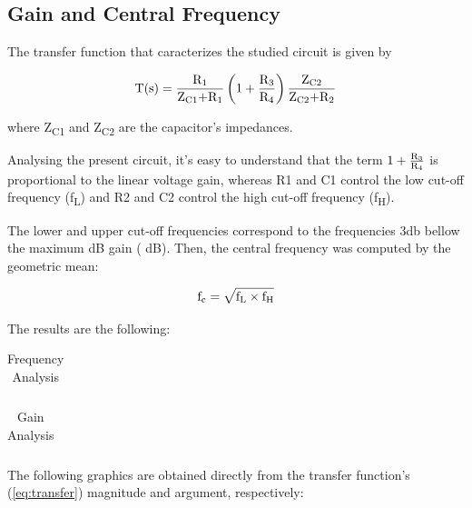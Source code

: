 \subsection{Gain and Central Frequency}
 
The transfer function that caracterizes the studied circuit is given by

\begin{equation} \label{eq:transfer}
 \text{T(s)}=\frac{\text{R\textsubscript1}}{\text{Z\textsubscript{C1}+R\textsubscript1}} \left( 1+\frac{\text{R\textsubscript3}}{\text{R\textsubscript4}}\right) \frac{\text{Z\textsubscript{C2}}}{\text{Z\textsubscript{C2}+R\textsubscript2}}
\end{equation}

where Z\textsubscript{C1} and Z\textsubscript{C2} are the capacitor's impedances.

Analysing the present circuit, it's easy to understand that the term $ 1+\frac{\text{R\textsubscript3}}{\text{R\textsubscript4}}$ is proportional to the linear voltage gain, whereas R1 and C1 control the low cut-off frequency (f\textsubscript{L}) and R2 and C2 control the high cut-off frequency (f\textsubscript{H}).

The lower and upper cut-off frequencies correspond to the frequencies 3db bellow the maximum dB gain ( dB). Then, the central frequency was computed by the geometric mean:

\begin{equation}
 \text{f\textsubscript{c}}= \sqrt{\text{f\textsubscript{L}} \times \text{f\textsubscript{H}}}
\end{equation}

The results are the following:

\begin{table}[!htb]
\centering
  \begin{tabular}{|c | c|}
    \hline    
    
 \end{tabular}
 \caption{Frequency Analysis}\label{tab:theo:frequencies}
\end{table}


\begin{table}[!htb]
\centering
  \begin{tabular}{|c | c|}
    \hline    
    
 \end{tabular}
 \caption{Gain Analysis}\label{tab:theo:gain}
\end{table}

The following graphics are obtained directly from the transfer function's (\ref{eq:transfer}) magnitude and argument, respectively:



